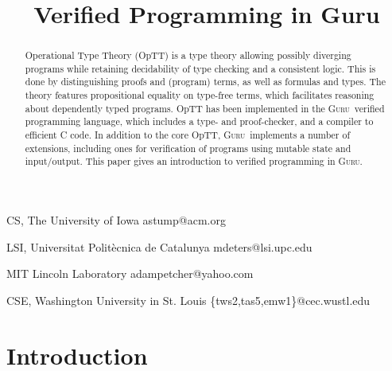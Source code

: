 \documentclass[preprint,natbib]{sigplanconf}
\newcommand{\guru}[0]{\textsc{Guru}}
\begin{document}
\copyrightdata{\ } 

\titlebanner{\ }        %
\preprintfooter{\ }   %



\title{Verified Programming in Guru}

{CS, The University of Iowa}
{astump@acm.org}

{LSI, Universitat Polit\`{e}cnica de Catalunya }
{mdeters@lsi.upc.edu}

{MIT Lincoln Laboratory}
{adampetcher@yahoo.com}

{CSE, Washington University in St. Louis}
{\{tws2,tas5,emw1\}@cec.wustl.edu}



\maketitle


\begin{abstract}
Operational Type Theory (OpTT) is a type theory allowing possibly
diverging programs while retaining decidability of type checking and a
consistent logic.  This is done by distinguishing proofs and (program)
terms, as well as formulas and types.  The theory features
propositional equality on type-free terms, which facilitates reasoning
about dependently typed programs.  OpTT has been implemented in the
\guru\ verified programming language, which includes a type- and
proof-checker, and a compiler to efficient C code.  In addition to the
core OpTT, \guru\ implements a number of extensions, including ones
for verification of programs using mutable state and input/output.
This paper gives an introduction to verified programming in \guru.
\end{abstract}

\section{Introduction}
\end{document}
